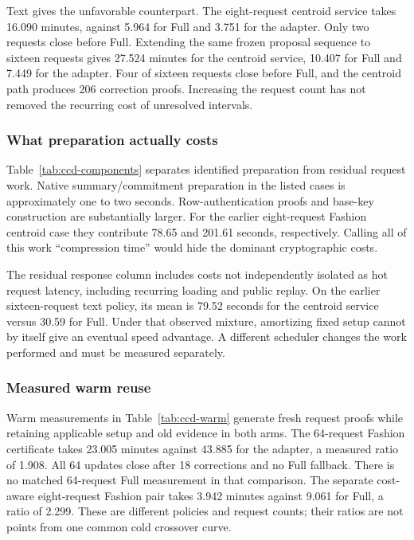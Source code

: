 Text gives the unfavorable counterpart. The eight-request centroid service
takes 16.090 minutes, against 5.964 for Full and 3.751 for the adapter. Only
two requests close before Full. Extending the same frozen proposal sequence
to sixteen requests gives 27.524 minutes for the centroid service, 10.407
for Full and 7.449 for the adapter. Four of sixteen requests close before
Full, and the centroid path produces 206 correction proofs. Increasing the
request count has not removed the recurring cost of unresolved intervals.

\subsubsection{What preparation actually costs}
Table~\ref{tab:ccd-components} separates identified preparation from residual
request work. Native summary/commitment preparation in the listed cases is
approximately one to two seconds. Row-authentication proofs and base-key
construction are substantially larger. For the earlier eight-request Fashion centroid
case they contribute 78.65 and 201.61 seconds, respectively. Calling all of
this work ``compression time'' would hide the dominant cryptographic costs.


The residual response column includes costs not independently isolated as
hot request latency, including recurring loading and public replay. On the
earlier sixteen-request text policy, its mean is 79.52 seconds for the centroid service
versus 30.59 for Full. Under that observed mixture, amortizing fixed setup
cannot by itself give an eventual speed advantage. A different scheduler
changes the work performed and must be measured separately.

\subsubsection{Measured warm reuse}
Warm measurements in Table~\ref{tab:ccd-warm} generate fresh request proofs
while retaining applicable setup and old evidence in both arms. The
64-request Fashion certificate takes 23.005 minutes against 43.885 for the adapter,
a measured ratio of 1.908. All 64 updates close after 18 corrections and no
Full fallback. There is no matched 64-request Full measurement in that comparison.
The separate cost-aware eight-request Fashion pair takes 3.942 minutes against 9.061 for
Full, a ratio of 2.299. These are different policies and request counts;
their ratios are not points from one common cold crossover curve.


